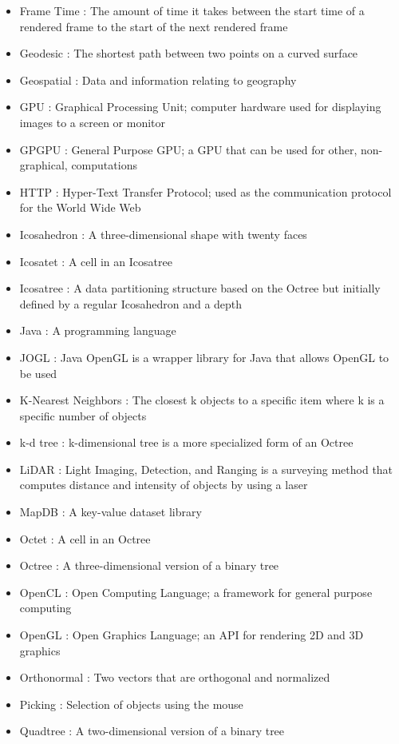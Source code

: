 \begin{itemize}
   \item Frame Time : The amount of time it takes between the start time of a rendered frame to the start of the next rendered frame
   \item Geodesic : The shortest path between two points on a curved surface
   \item Geospatial : Data and information relating to geography
   \item GPU : Graphical Processing Unit; computer hardware used for displaying images to a screen or monitor
   \item GPGPU : General Purpose GPU; a GPU that can be used for other, non-graphical, computations
   \item HTTP : Hyper-Text Transfer Protocol; used as the communication protocol for the World Wide Web
   \item Icosahedron : A three-dimensional shape with twenty faces
   \item Icosatet : A cell in an Icosatree
   \item Icosatree : A data partitioning structure based on the Octree but initially defined by a regular Icosahedron and a depth
   \item Java : A programming language
   \item JOGL : Java OpenGL is a wrapper library for Java that allows OpenGL to be used
   \item K-Nearest Neighbors : The closest k objects to a specific item where k is a specific number of objects
   \item k-d tree : k-dimensional tree is a more specialized form of an Octree
   \item LiDAR : Light Imaging, Detection, and Ranging is a surveying method that computes distance and intensity of objects by using a laser
   \item MapDB : A key-value dataset library
   \item Octet : A cell in an Octree
   \item Octree : A three-dimensional version of a binary tree
   \item OpenCL : Open Computing Language; a framework for general purpose computing
   \item OpenGL : Open Graphics Language; an API for rendering 2D and 3D graphics
   \item Orthonormal : Two vectors that are orthogonal and normalized
   \item Picking : Selection of objects using the mouse
   \item Quadtree : A two-dimensional version of a binary tree

\end{itemize}
